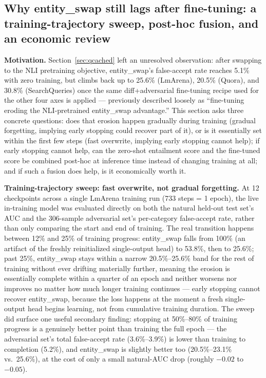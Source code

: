 \documentclass[11pt]{article}
\begin{document}
\subsection{Why entity\_swap still lags after fine-tuning: a training-trajectory sweep, post-hoc fusion, and an economic review}
\label{sec:qcachedfusion}

\textbf{Motivation.} Section~\ref{sec:qcached} left an unresolved observation: after swapping to the NLI pretraining objective, entity\_swap's false-accept rate reaches 5.1\% with zero training, but climbs back up to 25.6\% (LmArena), 20.5\% (Quora), and 30.8\% (SearchQueries) once the same diff+adversarial fine-tuning recipe used for the other four axes is applied --- previously described loosely as ``fine-tuning eroding the NLI-pretrained entity\_swap advantage.'' This section asks three concrete questions: does that erosion happen gradually during training (gradual forgetting, implying early stopping could recover part of it), or is it essentially set within the first few steps (fast overwrite, implying early stopping cannot help); if early stopping cannot help, can the zero-shot entailment score and the fine-tuned score be combined post-hoc at inference time instead of changing training at all; and if such a fusion does help, is it economically worth it.

\textbf{Training-trajectory sweep: fast overwrite, not gradual forgetting.} At 12 checkpoints across a single LmArena training run (733 steps = 1 epoch), the live in-training model was evaluated directly on both the natural held-out test set's AUC and the 306-sample adversarial set's per-category false-accept rate, rather than only comparing the start and end of training. The real transition happens between 12\% and 25\% of training progress: entity\_swap falls from 100\% (an artifact of the freshly reinitialized single-output head) to 53.8\%, then to 25.6\%; past 25\%, entity\_swap stays within a narrow 20.5\%--25.6\% band for the rest of training without ever drifting materially further, meaning the erosion is essentially complete within a quarter of an epoch and neither worsens nor improves no matter how much longer training continues --- early stopping cannot recover entity\_swap, because the loss happens at the moment a fresh single-output head begins learning, not from cumulative training duration. The sweep did surface one useful secondary finding: stopping at 50\%--80\% of training progress is a genuinely better point than training the full epoch --- the adversarial set's total false-accept rate (3.6\%--3.9\%) is lower than training to completion (5.2\%), and entity\_swap is slightly better too (20.5\%--23.1\% vs.\ 25.6\%), at the cost of only a small natural-AUC drop (roughly $-0.02$ to $-0.05$).
\end{document}
